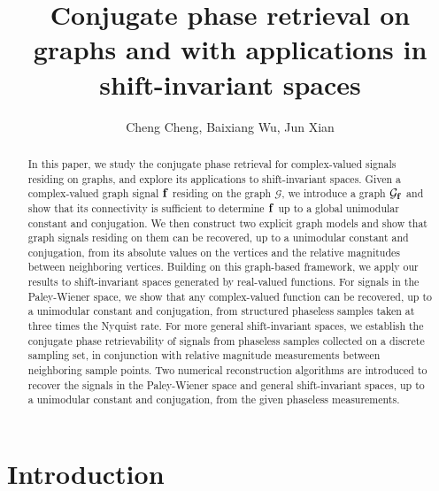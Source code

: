\documentclass[12pt,oneside,reqno]{amsart}
\title[]{Conjugate phase retrieval on graphs and with applications in shift-invariant spaces}
\author{Cheng Cheng, Baixiang Wu, Jun Xian}
\date{}
\numberwithin{equation}{section}
\begin{document}
	\maketitle
	
	\begin{abstract}
		In this paper, we study the conjugate phase retrieval for complex-valued \mbox{signals} residing on graphs, and explore its applications to shift-invariant spaces. Given a complex-valued graph signal $\bf f$ residing  on the graph $\mathcal G$, we introduce a graph ${\mathcal G}_{\bf f}$ and show that its connectivity is sufficient to determine 
		$\bf f$ up to a global unimodular constant and conjugation. We then construct two explicit graph models and show that graph signals residing on them can be recovered, up to a unimodular constant and conjugation, from its absolute values on the vertices and the relative magnitudes between neighboring vertices. 
	Building on this graph-based framework, we apply our results to shift-invariant spaces generated by real-valued functions. For signals in the Paley-Wiener space, we show that any complex-valued function can be recovered, up to a unimodular constant and conjugation, from structured phaseless samples taken at three times the Nyquist rate. For more general shift-invariant spaces, we establish the conjugate phase retrievability of signals from phaseless samples collected on a discrete sampling set, in conjunction with relative magnitude measurements between neighboring sample points. Two numerical reconstruction algorithms are  introduced to recover the signals in the Paley-Wiener space and general shift-invariant spaces, up to a unimodular constant and conjugation, from the given phaseless measurements.
	\end{abstract}
	
	
	
	
	
	\section{Introduction}
	
\end{document}
